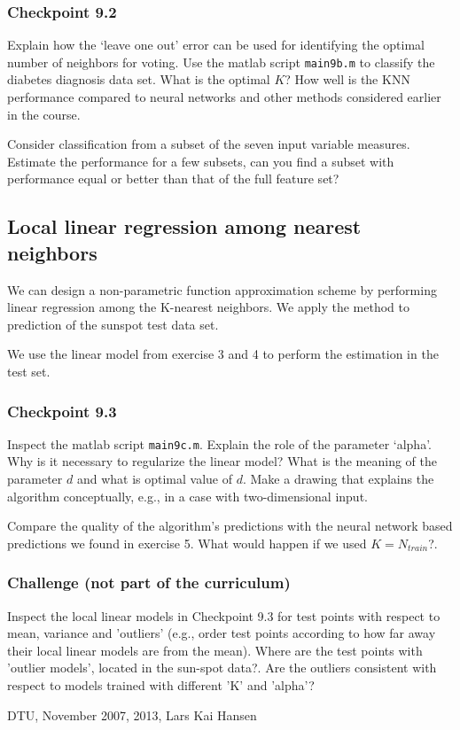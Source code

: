 \documentclass[12pt]{article}    %
\begin{document}
\subsubsection*{Checkpoint 9.2}
Explain how the `leave one out' error can be used for identifying the optimal number
of neighbors for voting. Use the matlab script {\tt main9b.m}
to classify the diabetes diagnosis data set.
What is the optimal $K$? How well is the KNN performance compared
to neural networks and other methods considered earlier in the course.

Consider classification from a subset of the seven input variable measures.
Estimate the performance for a few subsets, can you find a subset
with performance equal or better than that of the full feature set?

\subsection*{Local linear regression among nearest neighbors}

We can design a non-parametric function approximation scheme by
performing linear regression among the K-nearest neighbors. We apply the method
to prediction of the sunspot test data set.

We use the linear model from exercise 3 and 4 to perform the estimation
in the test set.

\subsubsection*{Checkpoint 9.3}
Inspect the matlab script {\tt main9c.m}. Explain the role of the parameter `alpha'.
Why is it necessary to regularize the linear model?
What is the meaning of the parameter $d$ and what is optimal value of $d$. 
Make a drawing that explains the algorithm conceptually, e.g.,  in a case with two-dimensional input.

Compare the  quality of the algorithm's predictions with
the neural network based predictions we found in exercise 5. What would happen if we used $K = N_{train}$?.

\subsubsection*{Challenge (not part of the curriculum)}
Inspect the local linear models in Checkpoint 9.3 for test points  with respect to mean, variance and 'outliers' (e.g., order test points according to how far away their local linear models are from the mean). Where are the test points with 'outlier models', located in the sun-spot data?. Are the outliers consistent with respect to models trained with different 'K' and 'alpha'?



\vspace{2cm}
\noindent DTU, November 2007, 2013, Lars Kai Hansen
\end{document}
